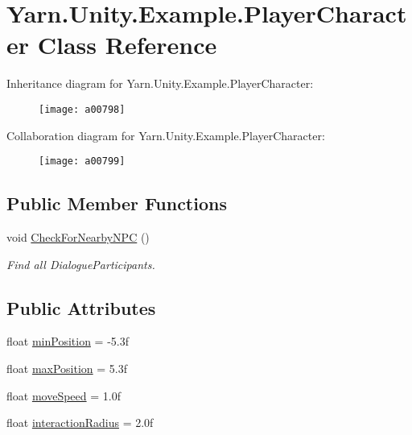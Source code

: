 \hypertarget{a00144}{\section{Yarn.\-Unity.\-Example.\-Player\-Character Class Reference}
\label{a00144}
}


Inheritance diagram for Yarn.\-Unity.\-Example.\-Player\-Character\-:
\nopagebreak
\begin{figure}[H]
\begin{center}
\leavevmode
\texttt{[image: a00798]}
\end{center}
\end{figure}


Collaboration diagram for Yarn.\-Unity.\-Example.\-Player\-Character\-:
\nopagebreak
\begin{figure}[H]
\begin{center}
\leavevmode
\texttt{[image: a00799]}
\end{center}
\end{figure}
\subsection*{Public Member Functions}
\begin{DoxyCompactItemize}
\item 
void \hyperlink{a00144_a574b6d984b8671c7a780d3d10e040a9b}{Check\-For\-Nearby\-N\-P\-C} ()
\begin{DoxyCompactList}\small\item\em Find all Dialogue\-Participants. \end{DoxyCompactList}\end{DoxyCompactItemize}
\subsection*{Public Attributes}
\begin{DoxyCompactItemize}
\item 
float \hyperlink{a00144_ac025d4f4afaf854f8256e0d2d03e5b52}{min\-Position} = -\/5.\-3f
\item 
float \hyperlink{a00144_ada9dd748a1d89a7f9b12ac8967a07ae6}{max\-Position} = 5.\-3f
\item 
float \hyperlink{a00144_adc602a4b2c7e44e4b15a11f1ffcf07e4}{move\-Speed} = 1.\-0f
\item 
float \hyperlink{a00144_af89807d2195915ee9a0c42317e110fc6}{interaction\-Radius} = 2.\-0f
\end{DoxyCompactItemize}
